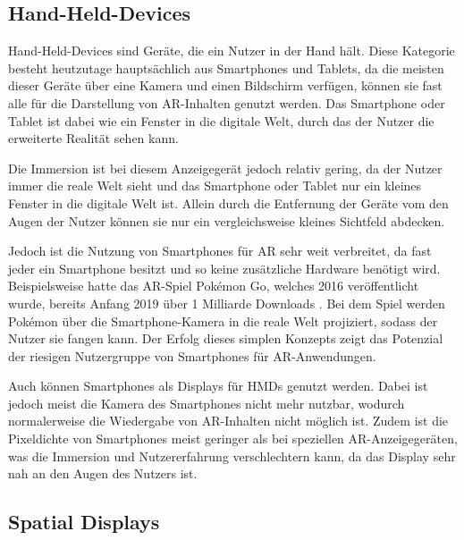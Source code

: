   \subsection{Hand-Held-Devices}

  Hand-Held-Devices sind Geräte, die ein Nutzer in der Hand hält.
  Diese Kategorie besteht heutzutage hauptsächlich aus Smartphones und Tablets, da die meisten dieser Geräte über eine Kamera und einen Bildschirm verfügen, können sie fast alle für die Darstellung von AR-Inhalten genutzt werden.
  Das Smartphone oder Tablet ist dabei wie ein Fenster in die digitale Welt, durch das der Nutzer die erweiterte Realität sehen kann.

  Die Immersion ist bei diesem Anzeigegerät jedoch relativ gering, da der Nutzer immer die reale Welt sieht und das Smartphone oder Tablet nur ein kleines Fenster in die digitale Welt ist.
  Allein durch die Entfernung der Geräte vom den Augen der Nutzer können sie nur ein vergleichsweise kleines Sichtfeld abdecken.

  Jedoch ist die Nutzung von Smartphones für AR sehr weit verbreitet, da fast jeder ein Smartphone besitzt und so keine zusätzliche Hardware benötigt wird.
  Beispielsweise hatte das AR-Spiel Pok\'emon Go, welches 2016 veröffentlicht wurde, bereits Anfang 2019 über 1 Milliarde Downloads \autocite[][]{pokemon-go-stats}.
  Bei dem Spiel werden Pok\'emon über die Smartphone-Kamera in die reale Welt projiziert, sodass der Nutzer sie fangen kann.
  Der Erfolg dieses simplen Konzepts zeigt das Potenzial der riesigen Nutzergruppe von Smartphones für AR-Anwendungen.

  Auch können Smartphones als Displays für HMDs genutzt werden.
  Dabei ist jedoch meist die Kamera des Smartphones nicht mehr nutzbar, wodurch normalerweise die Wiedergabe von AR-Inhalten nicht möglich ist.
  Zudem ist die Pixeldichte von Smartphones meist geringer als bei speziellen AR-Anzeigegeräten, was die Immersion und Nutzererfahrung verschlechtern kann, da das Display sehr nah an den Augen des Nutzers ist.

  

  \subsection{Spatial Displays}
